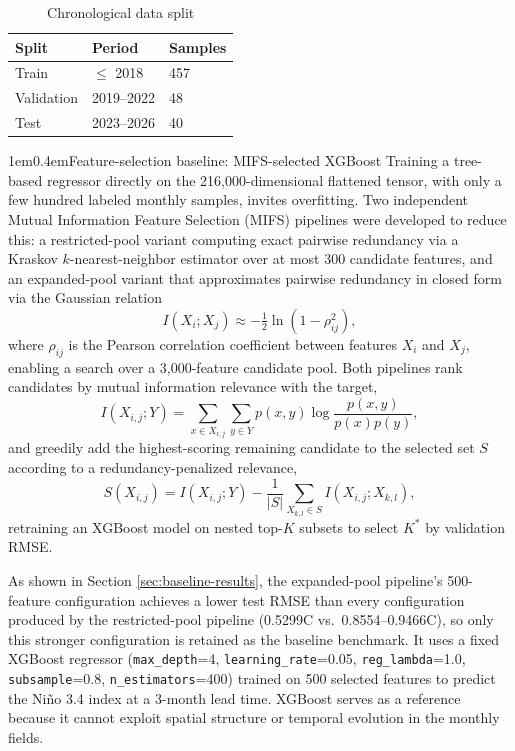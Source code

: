 \documentclass[10pt,a4paper]{article}
\makeatletter
\renewcommand\subsection{\@startsection{subsection}{2}{\z@}%
  {1em}{0.4em}{\normalfont\fontsize{10}{12}\selectfont\bfseries\itshape}}
\makeatother
\begin{document}
\begin{table}[!ht]
\centering
\caption{Chronological data split}
\label{tab:splits}
{\footnotesize
\begin{tabular}{@{}lll@{}}
\toprule
\textbf{Split} & \textbf{Period} & \textbf{Samples} \\
\midrule
Train & $\leq$ 2018 & 457 \\
Validation & 2019--2022 & 48 \\
Test & 2023--2026 & 40 \\
\bottomrule
\end{tabular}
}
\end{table}

\subsection{Feature-selection baseline: MIFS-selected XGBoost}
\label{sec:baseline}
Training a tree-based regressor directly on the 216,000-dimensional flattened tensor, with only a few hundred labeled monthly samples, invites overfitting. Two independent Mutual Information Feature Selection (MIFS) \cite{battiti1994} pipelines were developed to reduce this: a restricted-pool variant computing exact pairwise redundancy via a Kraskov $k$-nearest-neighbor estimator \cite{kraskov2004} over at most 300 candidate features, and an expanded-pool variant that approximates pairwise redundancy in closed form via the Gaussian relation
\begin{equation}
I(X_i;X_j) \approx -\tfrac{1}{2}\ln\!\left(1-\rho_{ij}^2\right),
\label{eq:gaussian}
\end{equation}
where $\rho_{ij}$ is the Pearson correlation coefficient between features $X_i$ and $X_j$, enabling a search over a 3,000-feature candidate pool. Both pipelines rank candidates by mutual information relevance with the target,
\begin{equation}
I(X_{i,j};Y) = \sum_{x\in X_{i,j}}\sum_{y\in Y} p(x,y)\log\frac{p(x,y)}{p(x)p(y)},
\label{eq:mi}
\end{equation}
and greedily add the highest-scoring remaining candidate to the selected set $S$ according to a redundancy-penalized relevance,
\begin{equation}
S(X_{i,j}) = I(X_{i,j};Y) - \frac{1}{|S|}\sum_{X_{k,l}\in S} I(X_{i,j};X_{k,l}),
\label{eq:mifs}
\end{equation}
retraining an XGBoost model on nested top-$K$ subsets to select $K^*$ by validation RMSE.

As shown in Section \ref{sec:baseline-results}, the expanded-pool pipeline's 500-feature configuration achieves a lower test RMSE than every configuration produced by the restricted-pool pipeline (0.5299\textdegree C vs.\ 0.8554--0.9466\textdegree C), so only this stronger configuration is retained as the baseline benchmark. It uses a fixed XGBoost regressor (\texttt{max\_depth}=4, \texttt{learning\_rate}=0.05, \texttt{reg\_lambda}=1.0, \texttt{subsample}=0.8, \texttt{n\_estimators}=400) trained on 500 selected features to predict the Ni\~no 3.4 index at a 3-month lead time. XGBoost serves as a reference because it cannot exploit spatial structure or temporal evolution in the monthly fields.
\end{document}
